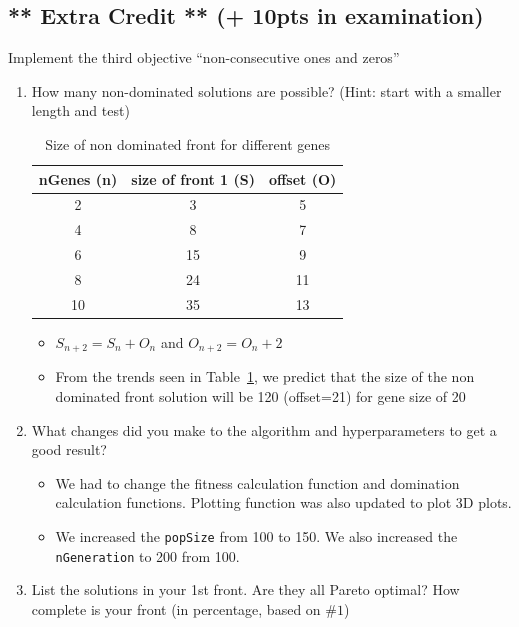 \documentclass{article}
\begin{document}
\subsection{** Extra Credit ** (+ 10pts in examination)}
Implement the third objective ``non-consecutive ones and zeros''
\begin{enumerate}
	\item How many non-dominated solutions are possible? (Hint: start with a smaller length and test)
        \begin{table}[htpb]
            \centering
            \caption{Size of non dominated front for different genes}\label{tab:genesVSsize}
            \begin{tabular}{c|c|c}
                \textbf{nGenes (n)} & \textbf{size of front 1 (S)} & \textbf{offset (O)} \\\hline
                    2 &  3 & 5\\
                    4 &  8 & 7\\
                    6 & 15 & 9\\
                    8 & 24 & 11\\
                    10 &35 & 13\\
            \end{tabular}
        \end{table}
        \color{blue}
        \begin{itemize}
            \item $S_{n+2} = S_{n} + O_{n}$ and $O_{n+2} = O_{n} + 2$
            \item From the trends seen in Table~\ref{tab:genesVSsize}, we predict that the size of the non dominated front solution will be 120  (offset=21) for gene size of 20
        \end{itemize}
        \color{black}
	\item What changes did you make to the algorithm and hyperparameters to get a good result?
        \color{blue}
        \begin{itemize}
            \item We had to change the fitness calculation function and domination calculation functions. Plotting function was also updated to plot 3D plots.
            \item We increased the \texttt{popSize} from 100 to 150. We also increased the \texttt{nGeneration} to 200 from 100.
        \end{itemize}
        \color{black}
	\item List the solutions in your 1st front. Are they all Pareto optimal? How complete is your front (in percentage, based on $\#1$)

\end{enumerate}
\end{document}
